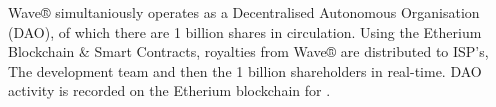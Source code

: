 \documentclass[letterpaper,10pt,english]{sphinxmanual}
\begin{document}
Wave® simultaniously operates as a Decentralised Autonomous Organisation (DAO), of which there are 1 billion shares in circulation.
Using the Etherium Blockchain \& Smart Contracts, royalties from Wave® are distributed to ISP’s, The development team and then the 1 billion shareholders in real-time. DAO activity is recorded on the Etherium blockchain for .


\begin{savenotes}\sphinxatlongtablestart{}
\end{savenotes}
\end{document}

